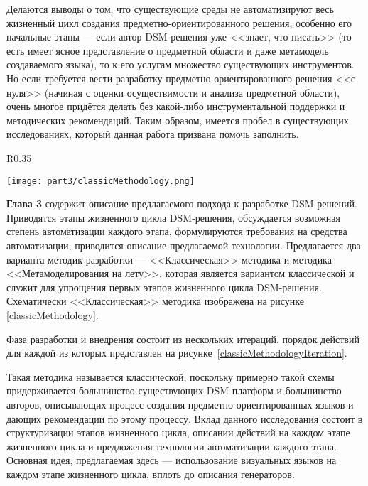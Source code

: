 Делаются выводы о том, что существующие среды не автоматизируют весь жизненный цикл
создания предметно-ориентированного решения, особенно его начальные этапы --- если автор DSM-решения уже 
<<знает, что писать>> (то есть имеет ясное представление о предметной области 
и даже метамодель создаваемого языка), то к его услугам множество существующих инструментов. 
Но если требуется вести разработку предметно-ориентированного решения <<с нуля>> (начиная 
с оценки осуществимости и анализа предметной области), очень многое придётся делать 
без какой-либо инструментальной поддержки и методических рекомендаций.
Таким образом, имеется пробел в существующих исследованиях, который данная работа
призвана помочь заполнить.

\begin{wrapfigure}{R}{0.35\textwidth}
	\begin{center}
		\texttt{[image: part3/classicMethodology.png]}
		\caption{<<Классическая>> методика разработки.}
		\label{classicMethodology}
	\end{center}
\end{wrapfigure}

\textbf{Глава 3} содержит описание предлагаемого подхода к разработке 
DSM-решений. Приводятся этапы жизненного цикла DSM-решения, обсуждается 
возможная степень автоматизации каждого этапа, формулируются требования на 
средства автоматизации, приводится описание предлагаемой технологии. Предлагается
два варианта методик разработки --- <<Классическая>> методика и методика <<Метамоделирования
на лету>>, которая является вариантом классической и служит для упрощения первых этапов
жизненного цикла DSM-решения. Схематически <<Классическая>> методика изображена на рисунке
\ref{classicMethodology}.

Фаза разработки и внедрения состоит из нескольких итераций, порядок действий для каждой 
из которых представлен на рисунке~\ref{classicMethodologyIteration}. 

Такая методика называется классической, поскольку примерно такой схемы придерживается
большинство существующих DSM-платформ и большинство авторов, описывающих процесс создания
предметно-ориентированных языков и дающих рекомендации по этому процессу. Вклад данного 
исследования состоит в структуризации этапов жизненного цикла, описании действий на 
каждом этапе жизненного цикла и предложения технологии автоматизации каждого этапа.
Основная идея, предлагаемая здесь --- использование визуальных языков на каждом
этапе жизненного цикла, вплоть до описания генераторов.

